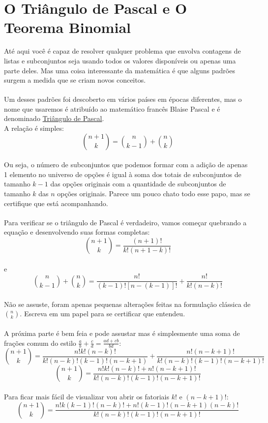 \documentclass[a4paper,11pt,oneside]{book}
\theoremstyle{definition}
\theoremstyle{break}
\begin{document}
\section{O Triângulo de Pascal e O Teorema Binomial}
Até aqui você é capaz de resolver qualquer problema que envolva contagens de listas e subconjuntos seja usando todos os valores disponíveis ou apenas uma parte deles. Mas uma coisa interessante da matemática é que alguns padrões surgem a medida que se criam novos conceitos.
\\
\\
Um desses padrões foi descoberto em vários países em épocas diferentes, mas o nome que usaremos é atribuído ao matemático francês Blaise Pascal e é denominado \href{https://pt.wikipedia.org/wiki/Tri\%C3\%A2ngulo_de_Pascal}{Triângulo de Pascal}.
\\
A relação é simples:
\\
$$ {n+1 \choose k} = {n \choose k-1} + {n \choose k} $$
\\
Ou seja, o número de subconjuntos que podemos formar com a adição de apenas 1 elemento no universo de opções é igual à soma dos totais de subconjuntos de tamanho $k-1$ das opções originais com a quantidade de subconjuntos de tamanho $k$ das $n$ opções originais. Parece um pouco chato todo esse papo, mas se certifique que está acompanhando.
\\
\\
Para verificar se o triângulo de Pascal é verdadeiro, vamos começar quebrando a equação e desenvolvendo suas formas completas:
$$ {n+1 \choose k} = \frac{(n+1)!}{k!(n+1-k)!}$$
\\
e
\\
$${n \choose k-1} + {n \choose k} = \frac{n!}{(k-1)![n-(k-1)]!} + \frac{n!}{k!(n-k)!}$$
\\
Não se assuste, foram apenas pequenas alterações feitas na formulação clássica de $n \choose k$. Escreva em um papel para se certificar que entendeu.
\\
\\
A próxima parte é bem feia e pode assustar mas é simplesmente uma soma de frações comum do estilo $\frac{a}{b} + \frac{c}{d} = \frac{ad+cb}{bd}$:
$${n+1 \choose k} = \frac{n!k!(n-k)!}{k!(n-k)!(k-1)!(n-k+1)} + \frac{n!(n-k+1)!}{k!(n-k)!(k-1)!(n-k+1)!}$$
$${n+1 \choose k} = \frac{n!k!(n-k)! + n!(n-k+1)!}{k!(n-k)!(k-1)!(n-k+1)!}$$
\\
Para ficar mais fácil de visualizar vou abrir os fatoriais $k!$ e $(n-k+1)!$:
$${n+1 \choose k} = \frac{n!k(k-1)!(n-k)! + n!(k-1)!(n-k+1)(n-k)!}{k!(n-k)!(k-1)!(n-k+1)!}$$
\end{document}
